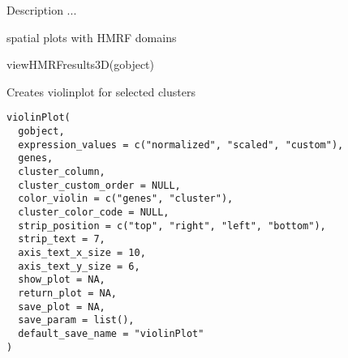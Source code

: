 \documentclass[a4paper]{book}
\begin{document}
%
\begin{Details}\relax
Description ...
\end{Details}
%
\begin{Value}
spatial plots with HMRF domains
\end{Value}
%
\begin{SeeAlso}\relax
{}
\end{SeeAlso}
%
\begin{Examples}
\begin{ExampleCode}
    viewHMRFresults3D(gobject)
\end{ExampleCode}
\end{Examples}
%
\begin{Description}\relax
Creates violinplot for selected clusters
\end{Description}
%
\begin{Usage}
\begin{verbatim}
violinPlot(
  gobject,
  expression_values = c("normalized", "scaled", "custom"),
  genes,
  cluster_column,
  cluster_custom_order = NULL,
  color_violin = c("genes", "cluster"),
  cluster_color_code = NULL,
  strip_position = c("top", "right", "left", "bottom"),
  strip_text = 7,
  axis_text_x_size = 10,
  axis_text_y_size = 6,
  show_plot = NA,
  return_plot = NA,
  save_plot = NA,
  save_param = list(),
  default_save_name = "violinPlot"
)
\end{verbatim}
\end{Usage}
%
\end{document}

